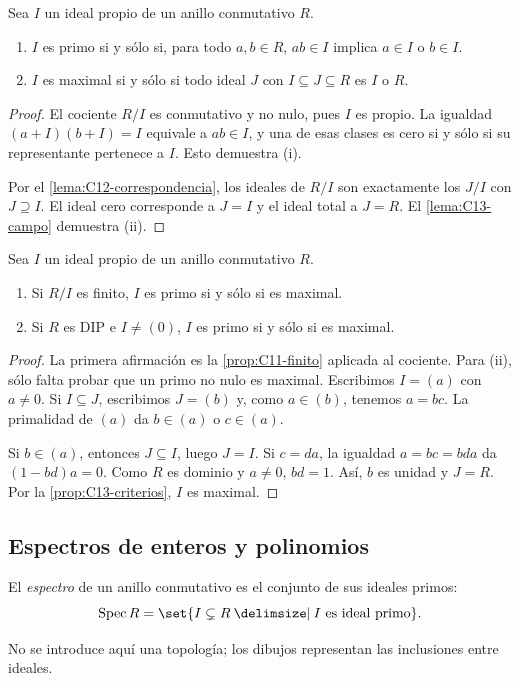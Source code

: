 \begin{prop}\label{prop:C13-criterios}
Sea $I$ un ideal propio de un anillo conmutativo $R$.
\begin{enumerate}[label=\textup{(\roman*)}]
\item $I$ es primo si y sólo si, para todo $a,b\in R$, $ab\in I$ implica $a\in I$ o $b\in I$.
\item $I$ es maximal si y sólo si todo ideal $J$ con $I\subseteq J\subseteq R$ es $I$ o $R$.
\end{enumerate}
\end{prop}
\begin{proof}
El cociente $R/I$ es conmutativo y no nulo, pues $I$ es propio. La igualdad $(a+I)(b+I)=I$ equivale a $ab\in I$, y una de esas clases es cero si y sólo si su representante pertenece a $I$. Esto demuestra (i).

Por el \cref{lema:C12-correspondencia}, los ideales de $R/I$ son exactamente los $J/I$ con $J\supseteq I$. El ideal cero corresponde a $J=I$ y el ideal total a $J=R$. El \cref{lema:C13-campo} demuestra (ii).
\end{proof}

\begin{prop}\label{prop:C13-primo-maximal}
Sea $I$ un ideal propio de un anillo conmutativo $R$.
\begin{enumerate}[label=\textup{(\roman*)}]
\item Si $R/I$ es finito, $I$ es primo si y sólo si es maximal.
\item Si $R$ es DIP e $I\ne(0)$, $I$ es primo si y sólo si es maximal.
\end{enumerate}
\end{prop}
\begin{proof}
La primera afirmación es la \cref{prop:C11-finito} aplicada al cociente. Para (ii), sólo falta probar que un primo no nulo es maximal. Escribimos $I=(a)$ con $a\ne0$. Si $I\subseteq J$, escribimos $J=(b)$ y, como $a\in(b)$, tenemos $a=bc$. La primalidad de $(a)$ da $b\in(a)$ o $c\in(a)$.

Si $b\in(a)$, entonces $J\subseteq I$, luego $J=I$. Si $c=da$, la igualdad $a=bc=bda$ da $(1-bd)a=0$. Como $R$ es dominio y $a\ne0$, $bd=1$. Así, $b$ es unidad y $J=R$. Por la \cref{prop:C13-criterios}, $I$ es maximal.
\end{proof}

\subsection{Espectros de enteros y polinomios}\label{tema:13-1-3}
\begin{defi}
El \emph{espectro} de un anillo conmutativo es el conjunto de sus ideales primos:
\[
\Spec R=\set{I\subsetneq R\given I\text{ es ideal primo}}.
\]
\end{defi}
No se introduce aquí una topología; los dibujos representan las inclusiones entre ideales.

